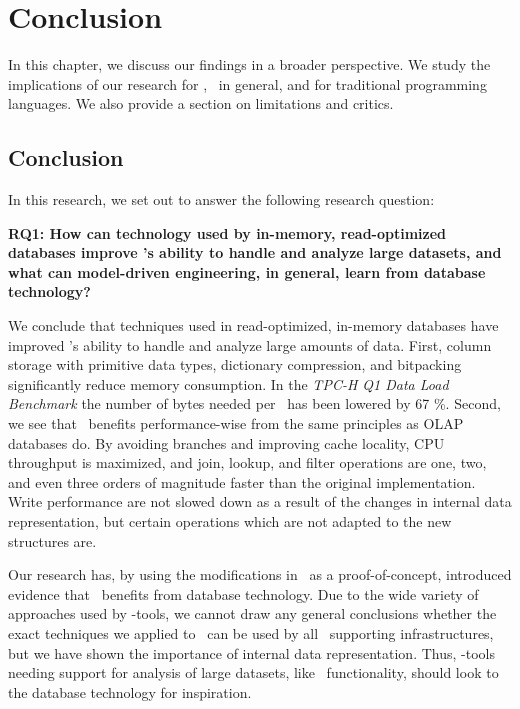 \chapter{Conclusion}
\label{chap:Conclusion}
In this chapter, we discuss our findings in a broader perspective. We study the implications of our research for \gap, \mde~in general, and for traditional programming languages. We also provide a section on limitations and critics. 

\clearpage

\section{Conclusion}
\label{sec:Conclusion}

In this research, we set out to answer the following research question:

\setlength{\leftskip}{1cm}

\textbf{RQ1: How can technology used by in-memory, read-optimized databases improve \gap's ability to handle and analyze large datasets, and what can model-driven engineering, in general, learn from database technology?}

\setlength{\leftskip}{0pt}

We conclude that techniques used in read-optimized, in-memory databases have improved \gap's ability to handle and analyze large amounts of data. First, column storage with primitive data types, dictionary compression, and bitpacking significantly reduce memory consumption. In the \textit{TPC-H Q1 Data Load Benchmark} the number of bytes needed per \lineitem~has been lowered by 67 \%. Second, we see that \gap~benefits performance-wise from the same principles as OLAP databases do. By avoiding branches and improving cache locality, CPU throughput is maximized, and join, lookup, and filter operations are one, two, and even three orders of magnitude faster than the original implementation. Write performance are not slowed down as a result of the changes in internal data representation, but certain operations which are not adapted to the new structures are.

Our research has, by using the modifications in \gap~as a proof-of-concept, introduced evidence that \mde~benefits from database technology. Due to the wide variety of approaches used by \mdd-tools, we cannot draw any general conclusions whether the exact techniques we applied to \gap~can be used by all \mde~supporting infrastructures, but we have shown the importance of internal data representation. Thus, \mde-tools needing support for analysis of large datasets, like \bd~functionality, should look to the database technology for inspiration. 

